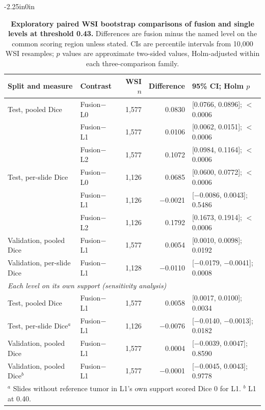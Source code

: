 \documentclass[10pt,letterpaper]{article}
\begin{document}
\begin{table}[H]\begin{adjustwidth}{-2.25in}{0in}\centering
\caption{\textbf{Exploratory paired WSI bootstrap comparisons of fusion and single levels at threshold 0.43.} Differences are fusion minus the named level on the common scoring region unless stated. CIs are percentile intervals from 10,000 WSI resamples; $p$ values are approximate two-sided values, Holm-adjusted within each three-comparison family.}\label{tab:followup_bootstrap}
\footnotesize
\begin{tabular}{llrrl}\toprule
Split and measure & Contrast & WSI $n$ & Difference & 95\% CI; Holm $p$ \\
\midrule
Test, pooled Dice & Fusion$-$L0 & 1,577 & 0.0830 & [0.0766, 0.0896]; $<$0.0006\\
 & Fusion$-$L1 & 1,577 & 0.0106 & [0.0062, 0.0151]; $<$0.0006\\
 & Fusion$-$L2 & 1,577 & 0.1072 & [0.0984, 0.1164]; $<$0.0006\\
Test, per-slide Dice & Fusion$-$L0 & 1,126 & 0.0685 & [0.0600, 0.0772]; $<$0.0006\\
 & Fusion$-$L1 & 1,126 & $-$0.0021 & [$-$0.0086, 0.0043]; 0.5486\\
 & Fusion$-$L2 & 1,126 & 0.1792 & [0.1673, 0.1914]; $<$0.0006\\
\midrule
Validation, pooled Dice & Fusion$-$L1 & 1,577 & 0.0054 & [0.0010, 0.0098]; 0.0192\\
Validation, per-slide Dice & Fusion$-$L1 & 1,128 & $-$0.0110 & [$-$0.0179, $-$0.0041]; 0.0008\\
\midrule
\multicolumn{5}{l}{\textit{Each level on its own support (sensitivity analysis)}}\\
Test, pooled Dice & Fusion$-$L1 & 1,577 & 0.0058 & [0.0017, 0.0100]; 0.0034\\
Test, per-slide Dice$^a$ & Fusion$-$L1 & 1,126 & $-$0.0076 & [$-$0.0140, $-$0.0013]; 0.0182\\
Validation, pooled Dice & Fusion$-$L1 & 1,577 & 0.0004 & [$-$0.0039, 0.0047]; 0.8590\\
Validation, pooled Dice$^b$ & Fusion$-$L1 & 1,577 & $-$0.0001 & [$-$0.0045, 0.0043]; 0.9778\\
\midrule\multicolumn{5}{l}{\footnotesize $^a$ Slides without reference tumor in L1's own support scored Dice 0 for L1. $^b$ L1 at 0.40.}\\
\bottomrule
\end{tabular}\normalsize\end{adjustwidth}
\end{table}
\end{document}
